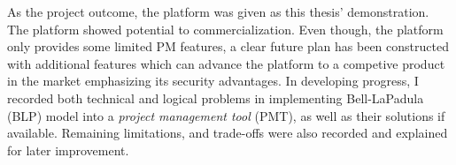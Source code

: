 As the project outcome, the platform was given as this thesis' demonstration.
The platform showed potential to commercialization.
Even though, the platform only provides some limited PM features, a clear future plan has been constructed with additional features which can advance the platform to a competive product in the market emphasizing its security advantages.
In developing progress, I recorded both technical and logical problems in implementing Bell-LaPadula (BLP) model into a \emph{project management tool} (PMT), as well as their solutions if available.
Remaining limitations, and trade-offs were also recorded and explained for later improvement.

\endgroup			

\vfill
